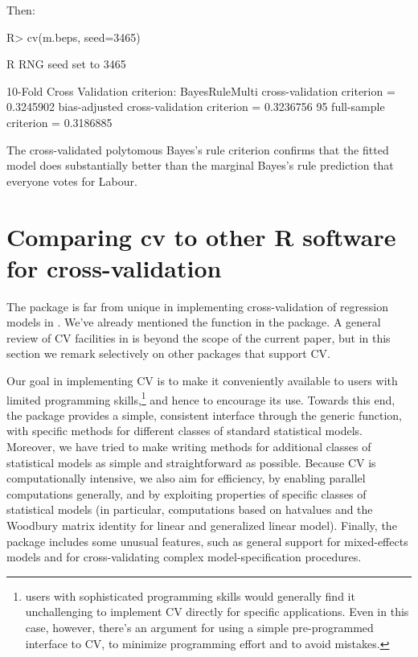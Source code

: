 \documentclass[
]{jss}
\begin{document}
Then:

\begin{CodeChunk}
\begin{CodeInput}
R> cv(m.beps, seed=3465)
\end{CodeInput}
\begin{CodeOutput}
R RNG seed set to 3465
\end{CodeOutput}
\begin{CodeOutput}
10-Fold Cross Validation
criterion: BayesRuleMulti
cross-validation criterion = 0.3245902
bias-adjusted cross-validation criterion = 0.3236756
95%
full-sample criterion = 0.3186885 
\end{CodeOutput}
\end{CodeChunk}

The cross-validated polytomous Bayes's rule criterion confirms that the
fitted model does substantially better than the marginal Bayes's rule
prediction that everyone votes for Labour.

\section{Comparing cv to other R software for
cross-validation}\label{comparing-cv-to-other-r-software-for-cross-validation}

The  package is far from unique in implementing cross-validation
of regression models in . We've already mentioned the
 function in the  package. A general review of
CV facilities in  is beyond the scope of the current paper,
but in this section we remark selectively on other  packages
that support CV.

Our goal in implementing CV is to make it conveniently available to
 users with limited programming skills,\footnote{
  users with sophisticated programming skills would generally find it
  unchallenging to implement CV directly for specific applications. Even
  in this case, however, there's an argument for using a simple
  pre-programmed interface to CV, to minimize programming effort and to
  avoid mistakes.} and hence to encourage its use. Towards this end, the
 package provides a simple, consistent interface through the
 generic function, with specific methods for different
classes of standard  statistical models. Moreover, we have
tried to make writing methods for additional classes of statistical
models as simple and straightforward as possible. Because CV is
computationally intensive, we also aim for efficiency, by enabling
parallel computations generally, and by exploiting properties of
specific classes of statistical models (in particular, computations
based on hatvalues and the Woodbury matrix identity for linear and
generalized linear model). Finally, the package includes some unusual
features, such as general support for mixed-effects models and for
cross-validating complex model-specification procedures.
\end{document}
